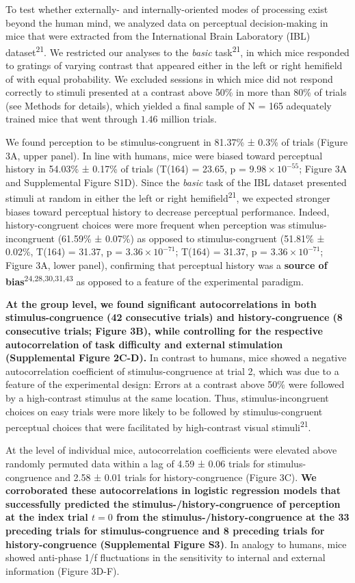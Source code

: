 \documentclass[
]{article}
\begin{document}
To test whether externally- and internally-oriented modes of processing
exist beyond the human mind, we analyzed data on perceptual
decision-making in mice that were extracted from the International Brain
Laboratory (IBL) dataset\textsuperscript{21}. We restricted our analyses
to the \emph{basic} task\textsuperscript{21}, in which mice responded to
gratings of varying contrast that appeared either in the left or right
hemifield of with equal probability. We excluded sessions in which mice
did not respond correctly to stimuli presented at a contrast above 50\%
in more than 80\% of trials (see Methods for details), which yielded a
final sample of N = 165 adequately trained mice that went through
\(1.46\) million trials.

We found perception to be stimulus-congruent in 81.37\% ± 0.3\% of
trials (Figure 3A, upper panel). In line with humans, mice were biased
toward perceptual history in 54.03\% ± 0.17\% of trials (T(164) = 23.65,
p = \(\ensuremath{9.98\times 10^{-55}}\); Figure 3A and Supplemental
Figure S1D). Since the \emph{basic} task of the IBL dataset presented
stimuli at random in either the left or right
hemifield\textsuperscript{21}, we expected stronger biases toward
perceptual history to decrease perceptual performance. Indeed,
history-congruent choices were more frequent when perception was
stimulus-incongruent (61.59\% ± 0.07\%) as opposed to stimulus-congruent
(51.81\% ± 0.02\%, T(164) = 31.37, p =
\(\ensuremath{3.36\times 10^{-71}}\); T(164) = 31.37, p =
\(\ensuremath{3.36\times 10^{-71}}\); Figure 3A, lower panel),
confirming that perceptual history was a \textbf{source of
bias}\textsuperscript{24,28,30,31,43} as opposed to a feature of the
experimental paradigm.

\textbf{At the group level, we found significant autocorrelations in
both stimulus-congruence (42 consecutive trials) and history-congruence
(8 consecutive trials; Figure 3B), while controlling for the respective
autocorrelation of task difficulty and external stimulation
(Supplemental Figure 2C-D).} In contrast to humans, mice showed a
negative autocorrelation coefficient of stimulus-congruence at trial 2,
which was due to a feature of the experimental design: Errors at a
contrast above 50\% were followed by a high-contrast stimulus at the
same location. Thus, stimulus-incongruent choices on easy trials were
more likely to be followed by stimulus-congruent perceptual choices that
were facilitated by high-contrast visual stimuli\textsuperscript{21}.

At the level of individual mice, autocorrelation coefficients were
elevated above randomly permuted data within a lag of 4.59 ± 0.06 trials
for stimulus-congruence and 2.58 ± 0.01 trials for history-congruence
(Figure 3C). \textbf{We corroborated these autocorrelations in logistic
regression models that successfully predicted the
stimulus-/history-congruence of perception at the index trial \(t = 0\)
from the stimulus-/history-congruence at the 33 preceding trials for
stimulus-congruence and 8 preceding trials for history-congruence
(Supplemental Figure S3)}. In analogy to humans, mice showed anti-phase
1/f fluctuations in the sensitivity to internal and external information
(Figure 3D-F).
\end{document}
